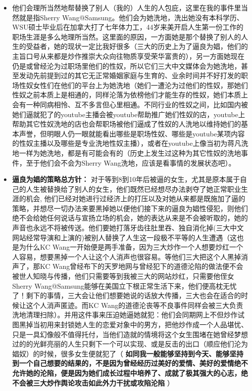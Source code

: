 \documentclass[9pt, b5paper]{article}
\begin{document}
\begin{itemize}
\begin{itemize}
\item 他们会理所当然地帮替换了别人（我的）人生的人包庇，这里在我的事件里当然就是指Sherry Wang@Samsung。他们会为她洗地，洗出她没有本科学历、WSU硕士毕业后在加拿大打了七年体力工，44岁来美开启人生第一份工作的职场生涯是多么地理所当然。这里面的原因，一方面她是那个替换了别人的人生的受益者，她的现状一定比我好很多（三大的历史上为了逼良为娼，他们的主旨口号从来都是炒作推崇大众向往物质享受荣华富贵的），另一方面她现在仍是或曾经沦为过职场里他们的性奴，所以它们三大中文媒体会为她洗地，甚至发动先前提到过的其它无正常婚姻家庭与生育的、业余时间并不好打发的职场性奴女性们在他们的平台上为她洗地（她们一遭沦为过他们的性奴，那她们性奴之前本质上是相通的，同样沦落为依榜他们才能生存的性奴，她们本质上会有一种同病相怜、互不多言但心里相通。不同行业的性奴之间，比如国内被她们逼就犯了的youtube主播会被youtube帮助推广她们性奴的店，youtube上帮助其它性奴洗地的店也会帮职场被他们逼成了性奴的人洗地以维持她们的基本声誉，但明眼人仍一眼就能看出哪些是职场性奴、哪些是youtube某项内容的性奴主播以及哪些是专业洗地性奴主播），或者在youtube上像当初为蒋凡洗地一样为她洗地，都是有可能会有的（历史上发生过这种为其它性奴的洗地事件，至于他们会不会为Sherry Wang洗地，应该是看事情的发展状态吧）。
\item \textbf{逼良为娼的策略总方针：} 对于等到8到10年后被逼的女生，尤其是原本属于自己的人生被替换给了别人的女生，他们既然已经想尽办法剥夺了她正常职业生涯的机会, 他们已经对她进行过经济上的打压以及对她从来都是既施加了逼的策略，并想尽一切办法来要黑掉她以便他们接下来的逼良为娼性侵犯，则他们绝不会给她任何说话与宣扬立场的机会，她的表达从来是不会被听取的，她的声音也永远不将被传送。他们要她打落牙齿往肚里吞、独自消化掉(三大中文网站经常导演和上演的)被别人替换了人生这一段极不平等的人生遭遇（这也是为什么KC Wang一开始便是两手准备，因为三大炒作一个人想要炒红一个人容易，想要黑掉一个人让这个人消声也很容易。等他们三大把这个人黑掉消声了，那KC Wang曾经布下的天罗地网与曾经犯下的道德沦陷的做法便不会被世人知晓与传播，他们只需要等到我被三大的网站炒红，只需要他侄女Sherry Wang@Samsung能够在美国立下根正常生活下来，他们便高枕无忧了！剩下的事情，三大会让他们想要她说的话放大传播，三大也会在适合的时候让这个人消声匿迹。而KC Wang的道德沦丧等不良事件同样会被三大负责洗地清理扫除）。并用这件事来压迫她逼她就犯：他们会同期网上不但炒作试图黑掉当初用来封锁她人生的恋爱对象中的男方，把他炒作成一个人品堪忧、只是一具幻像般不值得托付，当他们造就的情境将这个女生围堵在她曾经梦想过的的光鲜亮丽的人生只剩下一个可以实现、或是反击的出口（顺应他们沦为娼奴）的时候，很多女生便就犯了（ \textbf{如同我一般能够坚持到今天、能够坚持到一个自己想要的结果的，不是因为曾经经历过美好的爱情、美好的爱情绝不允许她的沦陷，便是因为她们成长过程中培养了、成就了极其强大的心志，绝不会被三大炒作舆论攻击如此外力干扰或攻陷沦陷} ）

\end{itemize}
\end{itemize}
\end{document}
